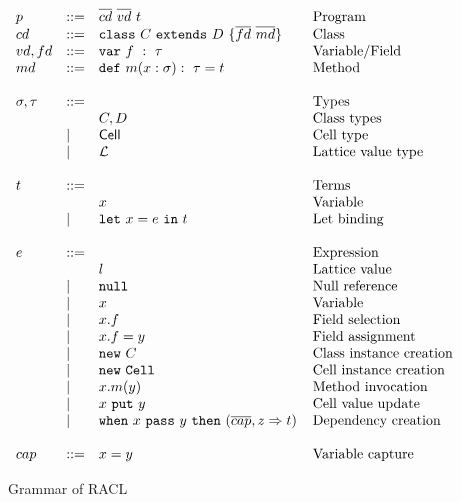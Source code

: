 \begin{figure}
  \centering
  $\begin{array}{lll@{\hspace{4mm}}l}
    p &::= &\overline{cd}~\overline{vd}~t  & \mbox{Program} \\
    cd &::= &\texttt{class}~C~\texttt{extends}~D~\{\overline{fd}~\overline{md}\}
    & \mbox{Class} \\
    vd,fd &::= &\texttt{var}~f~:~\tau & \mbox{Variable/Field} \\
    md &::= &\texttt{def}~m(x: \sigma):~\tau = t & \mbox{Method}\\
    &&&\\
    \sigma,\tau & ::= & & \mbox{Types} \\
    & & C, D & \mbox{Class types} \\ 
    &| & \CellType & \mbox{Cell type} \\
    &| & \LatType & \mbox{Lattice value type} \\
    &&&\\
    t &::=& & \mbox{Terms} \\
    & & x & \mbox{Variable} \\
    &|& \texttt{let}~x = e~\texttt{in}~t &\mbox{Let binding} \\
    &&&\\
    e &::=& & \mbox{Expression} \\
    & & l & \mbox{Lattice value} \\
    &|& \texttt{null} & \mbox{Null reference} \\
    &|& x &\mbox{Variable} \\
    &|& x.f &\mbox{Field selection} \\
    &|& x.f = y & \mbox{Field assignment} \\
    &|& \texttt{new}~C & \mbox{Class instance creation} \\
    &|& \texttt{new}~\texttt{Cell} & \mbox{Cell instance creation} \\
    &|& x.m(y) & \mbox{Method invocation} \\
    &|& x~\texttt{put}~y & \mbox{Cell value update} \\
    &|& \texttt{when}~x~\texttt{pass}~y~\texttt{then}~(\overline{cap}, z
    \Rightarrow t) & \mbox{Dependency creation} \\
    &&&\\
    cap & ::= & x = y & \mbox{Variable capture} \\
  \end{array}$
  \caption{Grammar of RACL}
  \label{fig:racl_grammar}
\end{figure}

